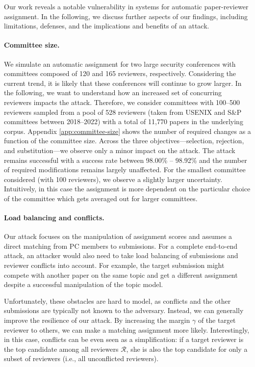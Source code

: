 \documentclass[letterpaper,twocolumn,10pt]{article}
\newcommand{\reviewersset}{\mathcal{R}}
\newcommand{\margin}{\gamma}
\begin{document}
Our work reveals a notable vulnerability in systems for automatic paper-reviewer assignment. 
In the following, we discuss further aspects of our findings, including limitations, defenses, and the implications and benefits of an attack.

\paragraph{Committee size.}
We simulate an automatic assignment for two large security conferences with {committees\EndAccSupp{}} composed of 120 and 165 reviewers, respectively. Considering the current trend, it is likely that these conferences will continue to grow larger. In the following, we want to understand how an increased set of concurring reviewers impacts the attack.
Therefore, we consider {committees\EndAccSupp{}} with 100--500 reviewers sampled from a pool of 528 reviewers (taken from USENIX and S\&P {committees\EndAccSupp{}} between 2018--2022) with a total of 11,770 papers in the underlying corpus.
Appendix \ref{app:committee-size} shows the number of required changes as a function of the committee size. Across the three objectives---selection, rejection, and substitution---we observe only a minor impact on the attack. The attack remains successful with a success rate between 98.00\% -- 98.92\% and the number of required modifications remains largely unaffected. For the smallest committee considered (with 100 reviewers), we observe a slightly larger uncertainty. Intuitively, in this case the assignment is more dependent on the particular choice of the committee which gets averaged out for larger committees.

\paragraph{Load balancing and conflicts.}
Our attack focuses on the manipulation of assignment scores and assumes a direct matching from PC members to submissions. For a complete end-to-end attack, an attacker would also need to take load balancing of submissions and reviewer conflicts into account. For example, the target submission might compete with another paper on the same topic and get a different assignment despite a successful manipulation of the topic model.

Unfortunately, these {obstacles\EndAccSupp{}} are hard to model, as conflicts and the other submissions are typically not known to the adversary. Instead, we can generally improve the resilience of our attack. By increasing the margin $\margin$ of the target reviewer to others, we can make a matching assignment more likely. Interestingly, in this case, conflicts can be even seen as a simplification: if a target reviewer is the top candidate among all reviewers $\reviewersset$, she is also the top candidate for only a subset of reviewers (i.e., all unconflicted reviewers).
\end{document}
